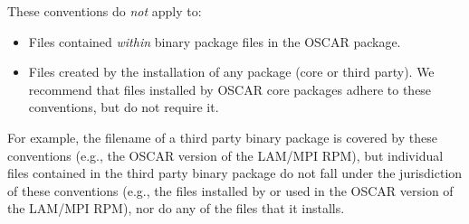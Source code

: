 \noindent These conventions do {\em not} apply to:

\begin{itemize}
\item Files contained {\em within} binary package files in the OSCAR
  package.
\item Files created by the installation of any package (core or third
  party).  We recommend that files installed by OSCAR core packages
  adhere to these conventions, but do not require it.
\end{itemize}

For example, the filename of a third party binary package is covered
by these conventions (e.g., the OSCAR version of the LAM/MPI RPM), but
individual files contained in the third party binary package do not
fall under the jurisdiction of these conventions (e.g., the files
installed by or used in the OSCAR version of the LAM/MPI RPM), nor do
any of the files that it installs.

